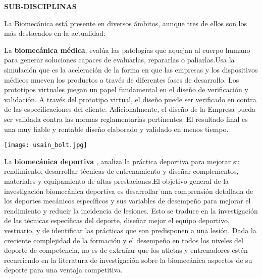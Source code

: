 \documentclass{article}
\begin{document}
\clearpage

\textbf{SUB-DISCIPLINAS}
\hspace{1cm}

La Biomecánica está presente en diversos ámbitos, aunque tres de ellos son los más destacados en la actualidad:

  La \textbf {biomecánica médica}, evalúa las patologías que aquejan al cuerpo humano para generar soluciones capaces de evaluarlas, repararlas o paliarlas.Usa la simulación que es la aceleración de la forma en que las empresas y los dispositivos médicos mueven los productos a través de diferentes fases de desarrollo. Los prototipos virtuales juegan un papel fundamental en el diseño de verificación y validación. A través del prototipo virtual, el diseño puede ser verificado en contra de las especificaciones del cliente. Adicionalmente, el diseño de la Empresa pueda ser validada contra las normas reglamentarias pertinentes. El resultado final es una muy fiable y rentable diseño elaborado y validado en menos tiempo.
  



\begin{minipage}{.89\linewidth}
\centering
\texttt{[image: usain\_bolt.jpg]}
\end{minipage}

La \textbf {biomecánica deportiva} , analiza la práctica deportiva para mejorar su rendimiento, desarrollar técnicas de entrenamiento y diseñar complementos, materiales y equipamiento de altas prestaciones.El objetivo general de la investigación biomecánica deportiva es desarrollar una comprensión detallada de los deportes mecánicos específicos y sus variables de desempeño para mejorar el rendimiento y reducir la incidencia de lesiones. Esto se traduce en la investigación de las técnicas específicas del deporte, diseñar mejor el equipo deportivo, vestuario, y de identificar las prácticas que son predisponen a una lesión. Dada la creciente complejidad de la formación y el desempeño en todos los niveles del deporte de competencia, no es de extrañar que los atletas y entrenadores estén recurriendo en la literatura de investigación sobre la biomecánica aspectos de su deporte para una ventaja competitiva.
\end{document}
